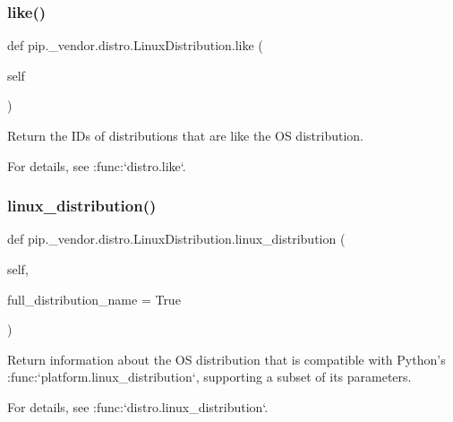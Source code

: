 \subsubsection{\texorpdfstring{like()}{like()}}
{\footnotesize\ttfamily def pip.\+\_\+vendor.\+distro.\+Linux\+Distribution.\+like (\begin{DoxyParamCaption}\item[{}]{self }\end{DoxyParamCaption})}

\begin{DoxyVerb}Return the IDs of distributions that are like the OS distribution.

For details, see :func:`distro.like`.
\end{DoxyVerb}
 \mbox{\label{classpip_1_1__vendor_1_1distro_1_1LinuxDistribution_a9deb9d70ba82d370ba5fd4b1ac7473e6}} 
\subsubsection{\texorpdfstring{linux\+\_\+distribution()}{linux\_distribution()}}
{\footnotesize\ttfamily def pip.\+\_\+vendor.\+distro.\+Linux\+Distribution.\+linux\+\_\+distribution (\begin{DoxyParamCaption}\item[{}]{self,  }\item[{}]{full\+\_\+distribution\+\_\+name = {\ttfamily True} }\end{DoxyParamCaption})}

\begin{DoxyVerb}Return information about the OS distribution that is compatible
with Python's :func:`platform.linux_distribution`, supporting a subset
of its parameters.

For details, see :func:`distro.linux_distribution`.
\end{DoxyVerb}
 \mbox{\label{classpip_1_1__vendor_1_1distro_1_1LinuxDistribution_a2fb20b28b68f25e4868e8d4b517bb710}} 
